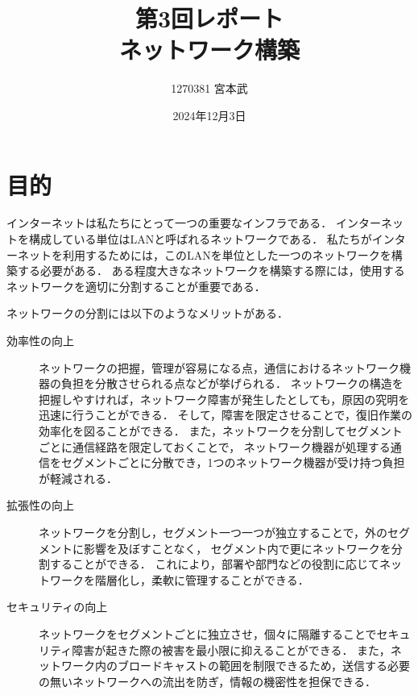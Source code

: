 \documentclass{jlreq}
\title{第3回レポート \\ \vspace{0.4cm} ネットワーク構築}
\author{1270381 宮本武}
\date{2024年12月3日}
\begin{document}
\maketitle

\section{目的}

インターネットは私たちにとって一つの重要なインフラである．
インターネットを構成している単位はLANと呼ばれるネットワークである．
私たちがインターネットを利用するためには，このLANを単位とした一つのネットワークを構築する必要がある．
ある程度大きなネットワークを構築する際には，使用するネットワークを適切に分割することが重要である．


ネットワークの分割には以下のようなメリットがある．

\begin{description}
    \item [効率性の向上] ネットワークの把握，管理が容易になる点，通信におけるネットワーク機器の負担を分散させられる点などが挙げられる．
    ネットワークの構造を把握しやすければ，ネットワーク障害が発生したとしても，原因の究明を迅速に行うことができる．
    そして，障害を限定させることで，復旧作業の効率化を図ることができる．
    また，ネットワークを分割してセグメントごとに通信経路を限定しておくことで，
    ネットワーク機器が処理する通信をセグメントごとに分散でき，1つのネットワーク機器が受け持つ負担が軽減される．

    \vspace{0.5cm}

    \item [拡張性の向上] ネットワークを分割し，セグメント一つ一つが独立することで，外のセグメントに影響を及ぼすことなく，
    セグメント内で更にネットワークを分割することができる．
    これにより，部署や部門などの役割に応じてネットワークを階層化し，柔軟に管理することができる．

    \vspace{0.5cm}

    \item [セキュリティの向上] 
    ネットワークをセグメントごとに独立させ，個々に隔離することでセキュリティ障害が起きた際の被害を最小限に抑えることができる．
    また，ネットワーク内のブロードキャストの範囲を制限できるため，送信する必要の無いネットワークへの流出を防ぎ，情報の機密性を担保できる．
\end{description}
\end{document}
